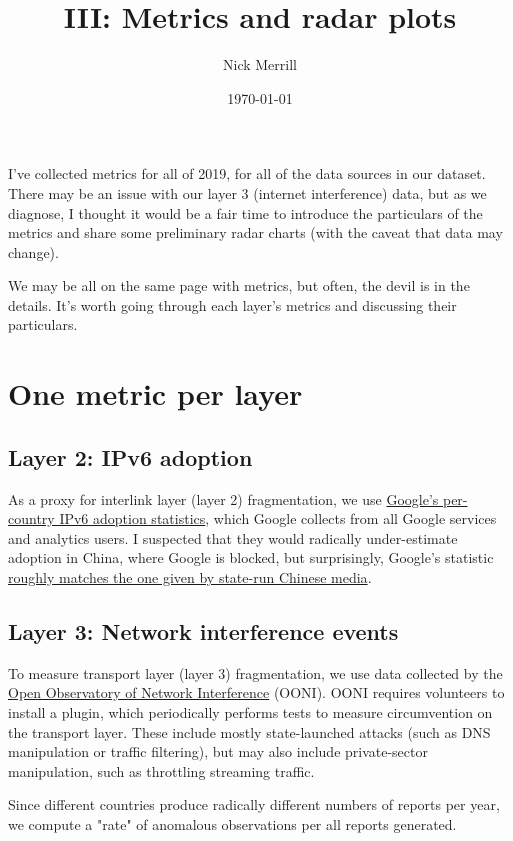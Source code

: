 \documentclass[11pt]{article}
\author{Nick Merrill}
\date{\today}
\title{III: Metrics and radar plots}
\begin{document}
\maketitle
I've collected metrics for all of 2019, for all of the data sources in our
dataset. There may be an issue with our layer 3 (internet interference) data,
but as we diagnose, I thought it would be a fair time to introduce the
particulars of the metrics and share some preliminary radar charts (with the
caveat that data may change).

We may be all on the same page with metrics, but often, the devil is in the
details. It's worth going through each layer's metrics and discussing their
particulars.

\section{One metric per layer}
\label{sec:org7813c1c}
\subsection{Layer 2: IPv6 adoption}
\label{sec:org5ef244e}

As a proxy for interlink layer (layer 2) fragmentation, we use \href{https://www.google.com/intl/en/ipv6/statistics.html\#tab=per-country-ipv6-adoption}{Google's
per-country IPv6 adoption statistics}, which Google collects from all Google
services and analytics users. I suspected that they would radically
under-estimate adoption in China, where Google is blocked, but surprisingly,
Google's statistic \href{http://www.xinhuanet.com/english/2019-03/14/c\_137895292.htm}{roughly matches the one given by state-run Chinese media}.

\subsection{Layer 3: Network interference events}
\label{sec:org7a8d8ae}

To measure transport layer (layer 3) fragmentation, we use data collected by the
\href{https://ooni.org/}{Open Observatory of Network Interference} (OONI). OONI requires volunteers to
install a plugin, which periodically performs tests to measure circumvention on
the transport layer. These include mostly state-launched attacks (such as DNS
manipulation or traffic filtering), but may also include private-sector
manipulation, such as throttling streaming traffic.

Since different countries produce radically different numbers of reports per
year, we compute a "rate" of anomalous observations per all reports generated.
\end{document}
